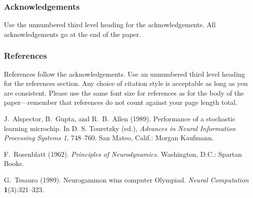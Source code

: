 \documentclass[twoside]{article}
\theoremstyle{plain}
\theoremstyle{definition}
\begin{document}
\subsubsection*{Acknowledgements}

Use the unnumbered third level heading for the acknowledgements.  All
acknowledgements go at the end of the paper.

\subsubsection*{References}

References follow the acknowledgements.  Use an unnumbered third level
heading for the references section.  Any choice of citation style is
acceptable as long as you are consistent.  Please use the same font
size for references as for the body of the paper---remember that
references do not count against your page length total.

\begin{thebibliography}{}
\setlength{\itemindent}{-\leftmargin}
\makeatletter\renewcommand{\@biblabel}[1]{}\makeatother
\bibitem{} J.~Alspector, B.~Gupta, and R.~B.~Allen (1989).
    \newblock Performance of a stochastic learning microchip.
    \newblock In D. S. Touretzky (ed.),
    \textit{Advances in Neural Information Processing Systems 1}, 748--760.
    San Mateo, Calif.: Morgan Kaufmann.

\bibitem{} F.~Rosenblatt (1962).
    \newblock \textit{Principles of Neurodynamics.}
    \newblock Washington, D.C.: Spartan Books.

\bibitem{} G.~Tesauro (1989).
    \newblock Neurogammon wins computer Olympiad.
    \newblock \textit{Neural Computation} \textbf{1}(3):321--323.
\end{thebibliography}
\end{document}
